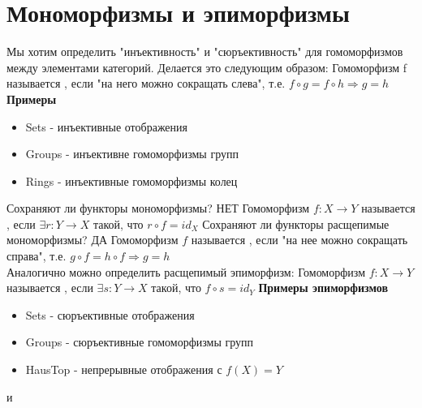 \documentclass[a4paper]{article}
\theoremstyle{indented}
\theoremstyle{definition}
\theoremstyle{remark}
\DeclareMathOperator{\ra}{\rightarrow}
\DeclareMathOperator{\Ra}{\Rightarrow}
\begin{document}
\section{Мономорфизмы и эпиморфизмы}
Мы хотим определить "инъективность" и "сюръективность" для гомоморфизмов между элементами категорий. Делается это следующим образом:
 Гомоморфизм f называется , если "на него можно сокращать слева", т.е. $f \circ g = f \circ h \Ra g = h$ \\
\textbf{Примеры}
\begin{itemize}
    \item Sets - инъективные отображения
    \item Groups - инъективне гомоморфизмы групп
    \item Rings - инъективные гомоморфизмы колец
\end{itemize}
\remark Сохраняют ли функторы мономорфизмы? НЕТ
 Гомоморфизм $f: X \ra Y$ называется , если $\exists r: Y \ra X$ такой, что $r \circ f = id_X$
\remark Сохраняют ли функторы расщепимые мономорфизмы? ДА
 Гомоморфизм $f$ называется , если "на нее можно сокращать справа", т.е. $g \circ f = h \circ f \Ra g = h$ \\
Аналогично можно определить расщепимый эпиморфизм:
 Гомоморфизм $f: X \ra Y$ называется , если $\exists s : Y \ra X$ такой, что $f \circ s = id_Y$
\textbf{Примеры эпиморфизмов}
\begin{itemize}
    \item Sets - сюръективные отображения
    \item Groups - сюръективные гомоморфизмы групп
    \item HausTop - непрерывные отображения с $f(X) = Y$
\end{itemize}
\exer {} и \\
\end{document}
